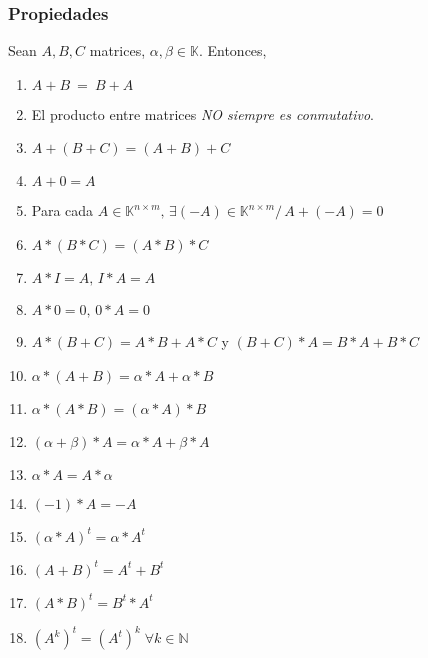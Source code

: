 \documentclass{article}
\newcommand{\comma}{,\,}                                %
\newcommand{\tq}{/\,}                                   %
\newcommand{\eq}{\:=\:}                                 %
\newcommand{\naturales}{\mathbb{N}}                     %
\newcommand{\cuerpo}{\mathbb{K}}                        %
\begin{document}
\subsubsection*{Propiedades}
Sean $A,B,C$ matrices, $\alpha,\beta \in \cuerpo$. Entonces,
\begin{enumerate}
    \item $A+B\eq B+A$
    \item El producto entre matrices \emph{NO siempre es conmutativo}.
    \item $A+(B+C) = (A+B)+C$
    \item $A + 0 = A$
    \item Para cada $A \in \cuerpo^{n \times m} \comma \exists (-A) \in \cuerpo^{n \times m} \tq A+(-A)=0$
    \item $A*(B*C)=(A*B)*C$
    \item $A*I = A \comma I*A=A$
    \item $A*0=0 \comma 0*A=0$
    \item $A*(B+C) = A*B + A*C$ y $(B+C)*A = B*A + B*C$
    \item $\alpha*(A+B)=\alpha*A + \alpha *B$
    \item $\alpha * (A*B) = (\alpha*A)*B$
    \item $(\alpha + \beta) * A = \alpha * A + \beta * A$
    \item $\alpha * A = A * \alpha$
    \item $(-1)*A=-A$
    \item $(\alpha*A)^t = \alpha * A^t$
    \item $ (A+B)^t=A^t+B^t$
    \item $(A*B)^t = B^t * A^t$
    \item $(A^k)^t = (A^t)^k \; \forall k \in \naturales$
\end{enumerate}
\end{document}

